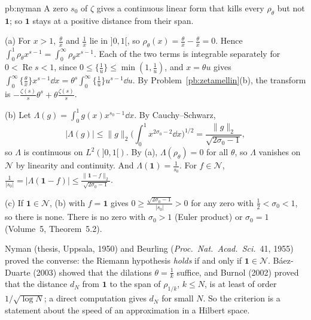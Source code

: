 \begin{solution}{pb:nyman}
\idea A zero $s_0$ of $\zeta$ gives a continuous linear form that kills every $\rho_\theta$ but not $\mathbf 1$; so $\mathbf 1$ stays at a positive distance from their span.

\writeup (a) For $x>1$, $\frac\theta x$ and $\frac1x$ lie in $]0,1[$, so $\rho_\theta(x)=\frac\theta x-\frac\theta x=0$. Hence $\int_0^1\rho_\theta x^{s-1}=\int_0^\infty\rho_\theta x^{s-1}$. Each of the two terms
is integrable separately for $0<\operatorname{Re}s<1$, since $0\le\{\frac1u\}\le\min(1,\frac1u)$, and $x=\theta u$ gives $\int_0^\infty\{\frac\theta x\}x^{s-1}\dd x=\theta^s\int_0^\infty\{\frac1u\}u^{s-1}\dd u$. By
Problem~\ref{pb:zetamellin}(b), the transform is $-\frac{\zeta(s)}s\theta^s+\theta\frac{\zeta(s)}s$.

(b) Let $\Lambda(g)=\int_0^1g(x)x^{s_0-1}\dd x$. By Cauchy--Schwarz,
\[
|\Lambda(g)|\le\|g\|_2\bigl(\int_0^1x^{2\sigma_0-2}\dd x\bigr)^{1/2}=\frac{\|g\|_2}{\sqrt{2\sigma_0-1}},
\]
so $\Lambda$ is continuous
on $L^2(]0,1[)$. By (a), $\Lambda(\rho_\theta)=0$ for all $\theta$, so $\Lambda$ vanishes on $\mathcal N$ by linearity and continuity. And $\Lambda(\mathbf 1)=\frac1{s_0}$. For $f\in\mathcal N$,
$\frac1{|s_0|}=|\Lambda(\mathbf 1-f)|\le\frac{\|\mathbf 1-f\|_2}{\sqrt{2\sigma_0-1}}$.

(c) If $\mathbf 1\in\mathcal N$, (b) with $f=\mathbf 1$ gives $0\ge\frac{\sqrt{2\sigma_0-1}}{|s_0|}>0$ for any zero with $\frac12<\sigma_0<1$, so there is none. There is no zero with $\sigma_0>1$ (Euler
product) or $\sigma_0=1$ (Volume~5, Theorem~5.2).

\leads Nyman (thesis, Uppsala, 1950) and Beurling (\emph{Proc.\ Nat.\ Acad.\ Sci.}\ 41, 1955) proved the converse: the Riemann hypothesis \emph{holds} if and only if $\mathbf 1\in\mathcal N$.
Báez-Duarte (2003) showed that the dilations $\theta=\frac1k$ suffice, and Burnol (2002) proved that the distance $d_N$ from $\mathbf 1$ to the span of $\rho_{1/k}$, $k\le N$, is at least of
order $1/\sqrt{\log N}$; a direct computation gives $d_N$ for small $N$. So the criterion is a statement about the speed of an approximation in a Hilbert space.
\end{solution}

